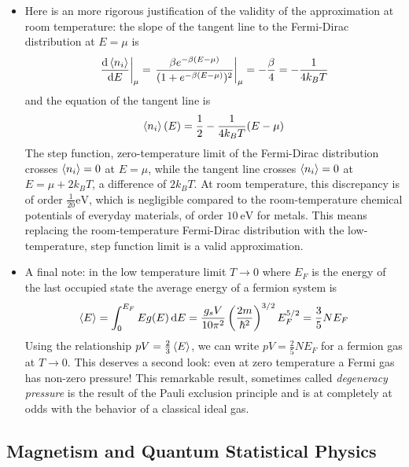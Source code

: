 \documentclass[11pt, a4paper]{article}
\newcommand{\diff}{\mathop{}\!\mathrm{d}} %
\begin{document}
\begin{itemize}
	\item Here is an more rigorous justification of the validity of the approximation at room temperature: the slope of the tangent line to the Fermi-Dirac distribution at $ E = \mu $ is
	\begin{equation*}
		\eval{\dv{\expval{n_{i}}}{E}}_{\mu} = \eval{\frac{\beta e^{-\beta(E - \mu)}}{(1 + e^{-\beta(E - \mu)})^{2}}}_{\mu} = - \frac{\beta}{4} = - \frac{1}{4k_{B}T}
	\end{equation*}
	and the equation of the tangent line is
	\begin{equation*}
		\expval{n_{i}}(E) = \frac{1}{2} - \frac{1}{4k_{B}T} (E - \mu)
	\end{equation*}
	The step function, zero-temperature limit of the Fermi-Dirac distribution crosses $ \expval{n_{i}} = 0 $ at $ E = \mu $, while the tangent line crosses $ \expval{n_{i}} = 0 $ at $ E = \mu + 2k_{B}T $, a difference of $ 2k_{B}T $. At room temperature, this discrepancy is of order $ \frac{1}{20} \si{\electronvolt} $, which is negligible compared to the room-temperature chemical potentials of everyday materials, of order $ \SI{10}{\electronvolt} $ for metals. This means replacing the room-temperature Fermi-Dirac distribution with the low-temperature, step function limit is a valid approximation.

	\item A final note: in the low temperature limit $ T \to 0 $ where $ E_{F} $ is the energy of the last occupied state the average energy of a fermion system is
	\begin{equation*}
		\expval{E} = \int_{0}^{E_{F}} E g(E) \diff E =  \frac{g_{s}V}{10\pi^{2}} \left(\frac{2m}{\hbar^{2}}\right)^{3/2} E_{F}^{5/2} = \frac{3}{5}NE_{F}
	\end{equation*}
	Using the relationship $ pV = \frac{2}{3}\expval{E} $, we can  write $ pV  = \frac{2}{5} N E_{F} $ for a fermion gas at $ T \to 0 $. This deserves a second look: even at zero temperature a Fermi gas has non-zero pressure! This remarkable result, sometimes called \textit{degeneracy pressure} is the result of the Pauli exclusion principle and is at completely at odds with the behavior of a classical ideal gas.
	
\end{itemize}


\subsection{Magnetism and Quantum Statistical Physics}
\end{document}
